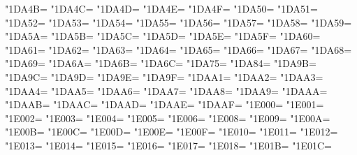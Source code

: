 \XeTeXcharclass"1DA4B=\KclassCM
\XeTeXcharclass"1DA4C=\KclassCM
\XeTeXcharclass"1DA4D=\KclassCM
\XeTeXcharclass"1DA4E=\KclassCM
\XeTeXcharclass"1DA4F=\KclassCM
\XeTeXcharclass"1DA50=\KclassCM
\XeTeXcharclass"1DA51=\KclassCM
\XeTeXcharclass"1DA52=\KclassCM
\XeTeXcharclass"1DA53=\KclassCM
\XeTeXcharclass"1DA54=\KclassCM
\XeTeXcharclass"1DA55=\KclassCM
\XeTeXcharclass"1DA56=\KclassCM
\XeTeXcharclass"1DA57=\KclassCM
\XeTeXcharclass"1DA58=\KclassCM
\XeTeXcharclass"1DA59=\KclassCM
\XeTeXcharclass"1DA5A=\KclassCM
\XeTeXcharclass"1DA5B=\KclassCM
\XeTeXcharclass"1DA5C=\KclassCM
\XeTeXcharclass"1DA5D=\KclassCM
\XeTeXcharclass"1DA5E=\KclassCM
\XeTeXcharclass"1DA5F=\KclassCM
\XeTeXcharclass"1DA60=\KclassCM
\XeTeXcharclass"1DA61=\KclassCM
\XeTeXcharclass"1DA62=\KclassCM
\XeTeXcharclass"1DA63=\KclassCM
\XeTeXcharclass"1DA64=\KclassCM
\XeTeXcharclass"1DA65=\KclassCM
\XeTeXcharclass"1DA66=\KclassCM
\XeTeXcharclass"1DA67=\KclassCM
\XeTeXcharclass"1DA68=\KclassCM
\XeTeXcharclass"1DA69=\KclassCM
\XeTeXcharclass"1DA6A=\KclassCM
\XeTeXcharclass"1DA6B=\KclassCM
\XeTeXcharclass"1DA6C=\KclassCM
\XeTeXcharclass"1DA75=\KclassCM
\XeTeXcharclass"1DA84=\KclassCM
\XeTeXcharclass"1DA9B=\KclassCM
\XeTeXcharclass"1DA9C=\KclassCM
\XeTeXcharclass"1DA9D=\KclassCM
\XeTeXcharclass"1DA9E=\KclassCM
\XeTeXcharclass"1DA9F=\KclassCM
\XeTeXcharclass"1DAA1=\KclassCM
\XeTeXcharclass"1DAA2=\KclassCM
\XeTeXcharclass"1DAA3=\KclassCM
\XeTeXcharclass"1DAA4=\KclassCM
\XeTeXcharclass"1DAA5=\KclassCM
\XeTeXcharclass"1DAA6=\KclassCM
\XeTeXcharclass"1DAA7=\KclassCM
\XeTeXcharclass"1DAA8=\KclassCM
\XeTeXcharclass"1DAA9=\KclassCM
\XeTeXcharclass"1DAAA=\KclassCM
\XeTeXcharclass"1DAAB=\KclassCM
\XeTeXcharclass"1DAAC=\KclassCM
\XeTeXcharclass"1DAAD=\KclassCM
\XeTeXcharclass"1DAAE=\KclassCM
\XeTeXcharclass"1DAAF=\KclassCM
\XeTeXcharclass"1E000=\KclassCM
\XeTeXcharclass"1E001=\KclassCM
\XeTeXcharclass"1E002=\KclassCM
\XeTeXcharclass"1E003=\KclassCM
\XeTeXcharclass"1E004=\KclassCM
\XeTeXcharclass"1E005=\KclassCM
\XeTeXcharclass"1E006=\KclassCM
\XeTeXcharclass"1E008=\KclassCM
\XeTeXcharclass"1E009=\KclassCM
\XeTeXcharclass"1E00A=\KclassCM
\XeTeXcharclass"1E00B=\KclassCM
\XeTeXcharclass"1E00C=\KclassCM
\XeTeXcharclass"1E00D=\KclassCM
\XeTeXcharclass"1E00E=\KclassCM
\XeTeXcharclass"1E00F=\KclassCM
\XeTeXcharclass"1E010=\KclassCM
\XeTeXcharclass"1E011=\KclassCM
\XeTeXcharclass"1E012=\KclassCM
\XeTeXcharclass"1E013=\KclassCM
\XeTeXcharclass"1E014=\KclassCM
\XeTeXcharclass"1E015=\KclassCM
\XeTeXcharclass"1E016=\KclassCM
\XeTeXcharclass"1E017=\KclassCM
\XeTeXcharclass"1E018=\KclassCM
\XeTeXcharclass"1E01B=\KclassCM
\XeTeXcharclass"1E01C=\KclassCM
